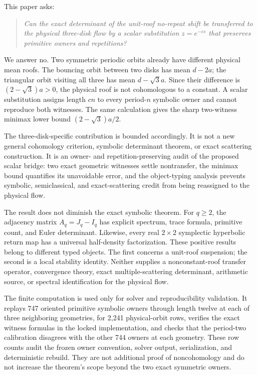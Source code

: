 \documentclass[11pt,a4paper]{article}
\theoremstyle{definition}
\theoremstyle{remark}
\begin{document}
This paper asks:
\begin{quote}
\emph{Can the exact determinant of the unit-roof no-repeat shift be transferred to the physical three-disk flow by a scalar substitution \(z=e^{-cs}\) that preserves primitive owners and repetitions?}
\end{quote}

We answer no. Two symmetric periodic orbits already have different physical mean roofs. The bouncing orbit between two disks has mean \(d-2a\); the triangular orbit visiting all three has mean \(d-\sqrt3a\). Since their difference is \((2-\sqrt3)a>0\), the physical roof is not cohomologous to a constant. A scalar substitution assigns length \(cn\) to every period-\(n\) symbolic owner and cannot reproduce both witnesses. The same calculation gives the sharp two-witness minimax lower bound \((2-\sqrt3)a/2\).

The three-disk-specific contribution is bounded accordingly. It is not a new general cohomology criterion, symbolic determinant theorem, or exact scattering construction. It is an owner- and repetition-preserving audit of the proposed scalar bridge: two exact geometric witnesses settle nontransfer, the minimax bound quantifies its unavoidable error, and the object-typing analysis prevents symbolic, semiclassical, and exact-scattering credit from being reassigned to the physical flow.

The result does not diminish the exact symbolic theorem. For \(q\ge2\), the adjacency matrix \(A_q=J_q-I_q\) has explicit spectrum, trace formula, primitive count, and Euler determinant. Likewise, every real \(2\times2\) symplectic hyperbolic return map has a universal half-density factorization. These positive results belong to different typed objects. The first concerns a unit-roof suspension; the second is a local stability identity. Neither supplies a nonconstant-roof transfer operator, convergence theory, exact multiple-scattering determinant, arithmetic source, or spectral identification for the physical flow.

The finite computation is used only for solver and reproducibility validation. It replays 747 oriented primitive symbolic owners through length twelve at each of three neighboring geometries, for 2,241 physical-orbit rows, verifies the exact witness formulas in the locked implementation, and checks that the period-two calibration disagrees with the other 744 owners at each geometry. These row counts audit the frozen owner convention, solver output, serialization, and deterministic rebuild. They are not additional proof of noncohomology and do not increase the theorem's scope beyond the two exact symmetric owners.
\end{document}
